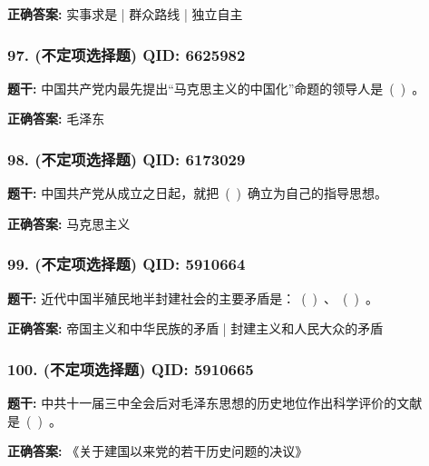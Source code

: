 \documentclass[12pt,UTF8]{ctexart}
\begin{document}
\textbf{正确答案:}
实事求是 | 群众路线 | 独立自主

\vspace{0.3em}\hrulefill\vspace{0.7em}

\subsubsection*{97. (不定项选择题) \small QID: 6625982}

\textbf{题干:}
中国共产党内最先提出“马克思主义的中国化”命题的领导人是 ( ) 。

\textbf{正确答案:}
毛泽东

\vspace{0.3em}\hrulefill\vspace{0.7em}

\subsubsection*{98. (不定项选择题) \small QID: 6173029}

\textbf{题干:}
中国共产党从成立之日起，就把 ( ) 确立为自己的指导思想。

\textbf{正确答案:}
马克思主义

\vspace{0.3em}\hrulefill\vspace{0.7em}

\subsubsection*{99. (不定项选择题) \small QID: 5910664}

\textbf{题干:}
近代中国半殖民地半封建社会的主要矛盾是： ( ) 、 ( ) 。

\textbf{正确答案:}
帝国主义和中华民族的矛盾 | 封建主义和人民大众的矛盾

\vspace{0.3em}\hrulefill\vspace{0.7em}

\subsubsection*{100. (不定项选择题) \small QID: 5910665}

\textbf{题干:}
中共十一届三中全会后对毛泽东思想的历史地位作出科学评价的文献是 ( ) 。

\textbf{正确答案:}
《关于建国以来党的若干历史问题的决议》

\vspace{0.3em}\hrulefill\vspace{0.7em}
\end{document}
